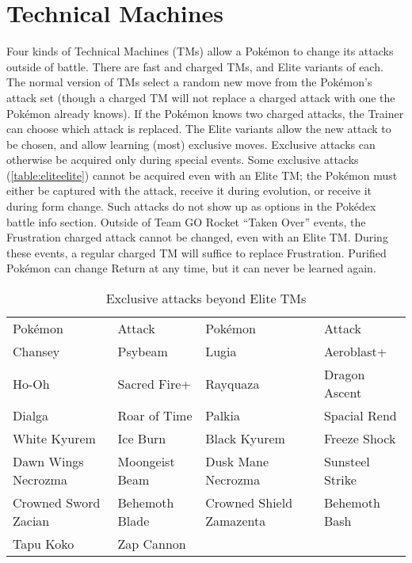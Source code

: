 



\section{Technical Machines\label{sec:tms}}
Four kinds of Technical Machines (TMs) allow a Pokémon to change its attacks outside of battle.
There are fast and charged TMs, and Elite variants of each.
The normal version of TMs select a random new move from the Pokémon's attack set (though a charged TM will not replace
 a charged attack with one the Pokémon already knows).
If the Pokémon knows two charged attacks, the Trainer can choose which attack is replaced.
The Elite variants allow the new attack to be chosen, and allow learning (most) exclusive moves.
Exclusive attacks can otherwise be acquired only during special events.
Some exclusive attacks (\autoref{table:eliteelite}) cannot be acquired even
 with an Elite TM; the Pokémon must either be captured with the attack, receive
 it during evolution, or receive it during form change.
Such attacks do not show up as options in the Pokédex battle info section.
Outside of Team GO Rocket ``Taken Over'' events, the Frustration charged attack cannot be
 changed, even with an Elite TM.
During these events, a regular charged TM will suffice to replace Frustration.
Purified Pokémon can change Return at any time, but it can never be learned again.
\begin{table}
\centering
\begin{tabular}{ll|ll}
Pokémon & Attack & Pokémon & Attack\\
\Midrule
Chansey             & Psybeam            & Lugia                   & Aeroblast+\\
Ho-Oh               & Sacred Fire+       & Rayquaza                & Dragon Ascent\\
Dialga              & Roar of Time       & Palkia                  & Spacial Rend\\
White Kyurem        & Ice Burn           & Black Kyurem            & Freeze Shock\\
Dawn Wings Necrozma & Moongeist Beam     & Dusk Mane Necrozma      & Sunsteel Strike\\
Crowned Sword Zacian& Behemoth Blade     & Crowned Shield Zamazenta& Behemoth Bash\\
Tapu Koko           & Zap Cannon         & & \\
\end{tabular}
\caption{Exclusive attacks beyond Elite TMs\label{table:eliteelite}}
\end{table}

